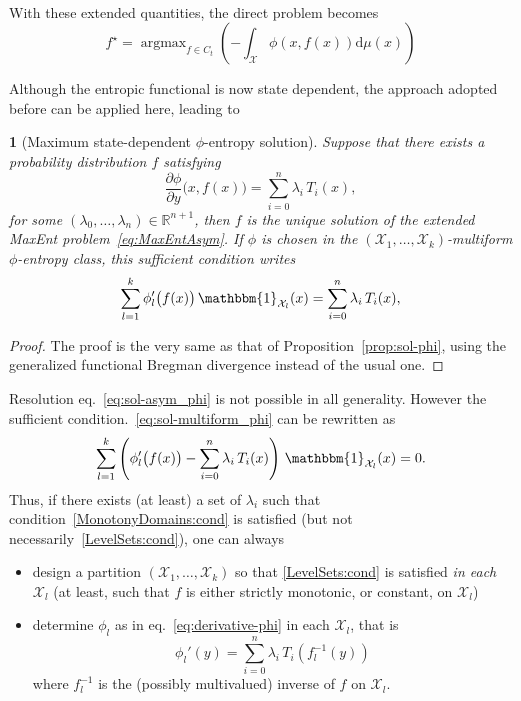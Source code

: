 \documentclass[english,sort&compress]{elsarticle}
\theoremstyle{definition}
\theoremstyle{plain}
\newtheorem{prop}{\protect\propositionname}
\theoremstyle{plain}
\providecommand{\propositionname}{Proposition}
\def\dmu{\mathrm{d}\mu}
\def\Rset{\mathbb{R}}
\def\X{\mathcal{X}}
\def\un{\mathbbm{1}}
\DeclareMathOperator*{\argmax}{\operatorname{argmax}}
\begin{document}
\

With these extended quantities, the direct problem becomes
%
\begin{equation}\label{eq:MaxEntAsym}
f^\star = \argmax_{f \in C_t} \left( - \int_\X \phi(x,f(x)) \dmu(x) \right)
\end{equation}

Although the  entropic functional is  now state dependent, the  approach adopted
before can be applied here, leading to

\begin{prop}[Maximum                state-dependent               $\phi$-entropy
  solution]\label{prop:sol-asym_phi}
%
  Suppose that there exists a probability distribution $f$ satisfying
  \begin{equation}\label{eq:sol-asym_phi}
  \frac{\partial \phi}{\partial y}\big(x,f(x)\big) = \sum_{i=0}^n \lambda_i \,
T_i(x),
  \end{equation}
  for  some  $(\lambda_0,\ldots,\lambda_n) \in  \Rset^{n+1}$,  then  $f$ is  the
  unique solution of  the extended MaxEnt problem~\eqref{eq:MaxEntAsym}.\newline
  If $\phi$ is  chosen in the $(\X_1 ,  \ldots , \X_k)$-multiform $\phi$-entropy
  class, this sufficient condition writes
  \begin{equation}\label{eq:sol-multiform_phi}
  \sum_{l=1}^k \phi_l'\big(f(x)\big) \, \un_{\X_l}(x) =
  \sum_{i=0}^n \lambda_i \, T_i(x),
  \end{equation}
\end{prop}
%
\begin{proof}
  The proof  is the very  same as that of  Proposition~\ref{prop:sol-phi}, using
  the generalized functional Bregman divergence instead of the usual one.
\end{proof}

Resolution  eq.~\eqref{eq:sol-asym_phi}  is  not  possible  in  all  generality.
However the sufficient  condition.~\eqref{eq:sol-multiform_phi} can be rewritten
as
%
\begin{equation}\label{eq:sol-multiform_phi_partitioned}
\sum_{l=1}^k \left( \phi_l'\big(f(x)\big) - \sum_{i=0}^n \lambda_i \, T_i(x)
\right) \, \un_{\X_l}(x) = 0.
\end{equation}
%
Thus,   if  there   exists  (at   least)  a   set  of   $\lambda_i$   such  that
condition~\ref{MonotonyDomains:cond}       is      satisfied       (but      not
necessarily~\ref{LevelSets:cond}), one can always
%
\begin{itemize}
\item design  a partition  $(\X_1,\ldots,\X_k)$ so that  \ref{LevelSets:cond} is
  satisfied {\em  in each $\X_l$}  (at least, such  that $f$ is  either strictly
  monotonic, or constant, on $\X_l$)
\item  determine $\phi_l$  as in  eq.~\eqref{eq:derivative-phi} in  each $\X_l$,
  that is
    \begin{equation}\label{eq:derivative-phil}
    \phi_l'(y) = \sum_{i=0}^n \lambda_i \, T_i\!\left(f_l^{-1}(y)\right)
    \end{equation}
    where $f_l^{-1}$ is the (possibly multivalued) inverse of $f$ on $\X_l$.
\end{itemize}
\end{document}
